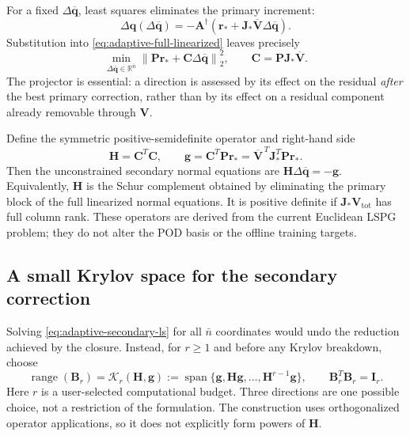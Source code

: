 \documentclass[11pt]{article}
\newcommand{\q}{\mathbf q}
\newcommand{\qbar}{\overline{\mathbf q}}
\newcommand{\norm}[1]{\left\lVert #1 \right\rVert}
\begin{document}
For a fixed $\Delta\qbar$, least squares eliminates the primary increment:
\begin{equation}
\Delta\q(\Delta\qbar)=-\mathbf A^\dagger
\left(\mathbf r_*+\mathbf J_*\overline{\mathbf V}\Delta\qbar\right).
\label{eq:adaptive-primary-elimination}
\end{equation}
Substitution into \eqref{eq:adaptive-full-linearized} leaves precisely
\begin{equation}
\min_{\Delta\qbar\in\mathbb R^{\bar n}}
\norm{\mathbf P\mathbf r_*+\mathbf C\Delta\qbar}_2^2,
\qquad \mathbf C=\mathbf P\mathbf J_*\overline{\mathbf V}.
\label{eq:adaptive-secondary-ls}
\end{equation}
The projector is essential: a direction is assessed by its effect on the
residual \emph{after} the best primary correction, rather than by its effect
on a residual component already removable through $\mathbf V$.

Define the symmetric positive-semidefinite operator and right-hand side
\begin{equation}
\mathbf H=\mathbf C^T\mathbf C,\qquad
\mathbf g=\mathbf C^T\mathbf P\mathbf r_*
=\overline{\mathbf V}^{\,T}\mathbf J_*^T\mathbf P\mathbf r_*.
\label{eq:adaptive-schur}
\end{equation}
Then the unconstrained secondary normal equations are
$\mathbf H\Delta\qbar=-\mathbf g$.  Equivalently, $\mathbf H$ is the
Schur complement obtained by eliminating the primary block of the full
linearized normal equations.  It is positive definite if
$\mathbf J_*\mathbf V_{\mathrm{tot}}$ has full column rank.  These
operators are derived from the current Euclidean LSPG problem; they do not
alter the POD basis or the offline training targets.

\subsection{A small Krylov space for the secondary correction}
Solving \eqref{eq:adaptive-secondary-ls} for all $\bar n$ coordinates
would undo the reduction achieved by the closure.  Instead, for $r\geq1$
and before any Krylov breakdown, choose
\begin{equation}
\operatorname{range}(\mathbf B_r)=\mathcal K_r(\mathbf H,\mathbf g)
:=\operatorname{span}\{\mathbf g,\mathbf H\mathbf g,\ldots,
\mathbf H^{r-1}\mathbf g\},\qquad \mathbf B_r^T\mathbf B_r=\mathbf I_r.
\label{eq:adaptive-krylov}
\end{equation}
Here $r$ is a user-selected computational budget.  Three directions are
one possible choice, not a restriction of the formulation.  The construction
uses orthogonalized operator applications, so it does not explicitly form
powers of $\mathbf H$.
\end{document}
